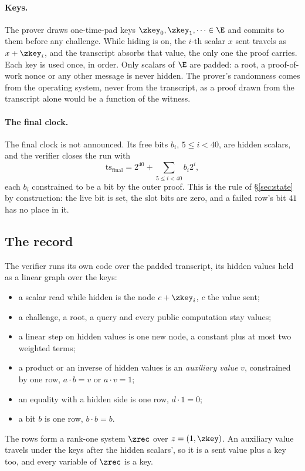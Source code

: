 \paragraph{Keys.} The prover draws one-time-pad keys $\zkey_0, \zkey_1, \dots \in \E$ and commits to them before any challenge. While hiding is on, the $i$-th scalar $x$ sent travels as $x + \zkey_i$, and the transcript absorbs that value, the only one the proof carries. Each key is used once, in order. Only scalars of $\E$ are padded: a root, a proof-of-work nonce or any other message is never hidden. The prover's randomness comes from the operating system, never from the transcript, as a proof drawn from the transcript alone would be a function of the witness.

\paragraph{The final clock.} The final clock is not announced. Its free bits $b_i$, $5 \le i < 40$, are hidden scalars, and the verifier closes the run with
\[
\mathrm{ts}_{\mathrm{final}} = 2^{40} + \sum_{5 \le i < 40} b_i 2^i,
\]
each $b_i$ constrained to be a bit by the outer proof. This is the rule of \S\ref{sec:state} by construction: the live bit is set, the slot bits are zero, and a failed row's bit $41$ has no place in it.

\subsection{The record}\label{zk:record}

The verifier runs its own code over the padded transcript, its hidden values held as a linear graph over the keys:
\begin{itemize}[itemsep=1pt,topsep=2pt]
\item a scalar read while hidden is the node $c + \zkey_i$, $c$ the value sent;
\item a challenge, a root, a query and every public computation stay values;
\item a linear step on hidden values is one new node, a constant plus at most two weighted terms;
\item a product or an inverse of hidden values is an \emph{auxiliary value} $v$, constrained by one row, $a \cdot b = v$ or $a \cdot v = 1$;
\item an equality with a hidden side is one row, $d \cdot 1 = 0$;
\item a bit $b$ is one row, $b \cdot b = b$.
\end{itemize}
The rows form a rank-one system $\zrec$ over $z = (1, \zkey)$. An auxiliary value travels under the keys after the hidden scalars', so it is a sent value plus a key too, and every variable of $\zrec$ is a key.

